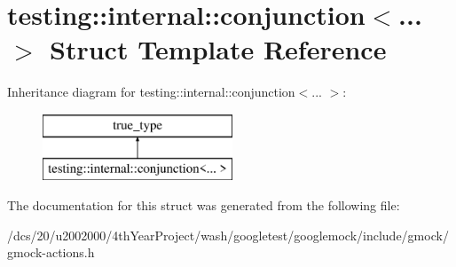\hypertarget{structtesting_1_1internal_1_1conjunction}{}\section{testing\+:\+:internal\+:\+:conjunction$<$... $>$ Struct Template Reference}
\label{structtesting_1_1internal_1_1conjunction}
Inheritance diagram for testing\+:\+:internal\+:\+:conjunction$<$... $>$\+:\begin{figure}[H]
\begin{center}
\leavevmode
\includegraphics[height=2.000000cm]{structtesting_1_1internal_1_1conjunction}
\end{center}
\end{figure}


The documentation for this struct was generated from the following file\+:\begin{DoxyCompactItemize}
\item 
/dcs/20/u2002000/4th\+Year\+Project/wash/googletest/googlemock/include/gmock/gmock-\/actions.\+h\end{DoxyCompactItemize}
